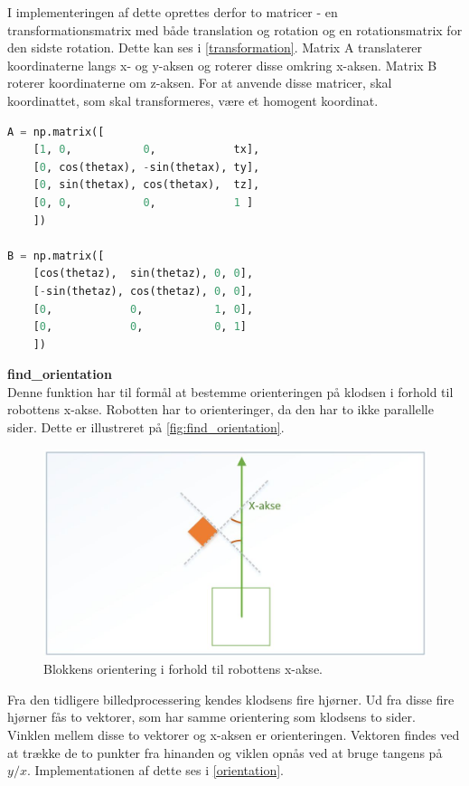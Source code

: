 I implementeringen af dette oprettes derfor to matricer - en transformationsmatrix med både translation og rotation og en rotationsmatrix for den sidste rotation. Dette kan ses i \autoref{transformation}. Matrix A translaterer koordinaterne langs x- og y-aksen og roterer disse omkring x-aksen. Matrix B roterer koordinaterne om z-aksen. For at anvende disse matricer, skal koordinattet, som skal transformeres, være et homogent koordinat.

\begin{lstlisting}[caption=Matricer til transformation., label=transformation, language=Python]
A = np.matrix([
    [1, 0,           0,            tx],
    [0, cos(thetax), -sin(thetax), ty],
    [0, sin(thetax), cos(thetax),  tz],
    [0, 0,           0,            1 ]
    ])

B = np.matrix([
    [cos(thetaz),  sin(thetaz), 0, 0],
    [-sin(thetaz), cos(thetaz), 0, 0],
    [0,            0,           1, 0],
    [0,            0,           0, 1]
    ])
\end{lstlisting}

\textbf{find\_orientation} \\
Denne funktion har til formål at bestemme orienteringen på klodsen i forhold til robottens x-akse. Robotten har to orienteringer, da den har to ikke parallelle sider. Dette er illustreret på \autoref{fig:find_orientation}. \\


\begin{figure}[h]
\centering
\includegraphics[scale=0.4]{images/findOrientation}
\caption{Blokkens orientering i forhold til robottens x-akse.}
\label{fig:find_orientation}
\end{figure}

Fra den tidligere billedprocessering kendes klodsens fire hjørner. Ud fra disse fire hjørner fås to vektorer, som har samme orientering som klodsens to sider. Vinklen mellem disse to vektorer og x-aksen er orienteringen. Vektoren findes ved at trække de to punkter fra hinanden og viklen opnås ved at bruge tangens på $y/x$. Implementationen af dette ses i \autoref{orientation}.

